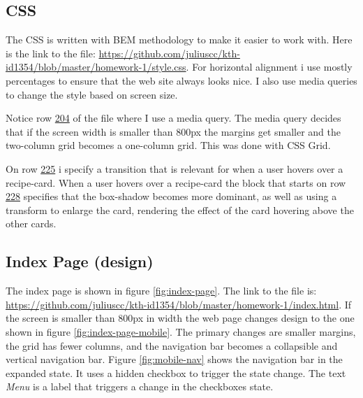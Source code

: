 \documentclass[a4paper]{scrartcl}
\begin{document}
\subsection{CSS}
The CSS is written with BEM methodology to make it easier to work with. Here is the link to the file: \href{https://github.com/juliuscc/kth-id1354/blob/master/homework-1/style.css}{https://github.com/juliuscc/kth-id1354/blob/master/homework-1/style.css}. For horizontal alignment i use mostly percentages to ensure that the web site always looks nice. I also use media queries to change the style based on screen size.

Notice row \href{https://github.com/juliuscc/kth-id1354/blob/090d3fcab0dbe83d8e9b82e8ad858ea1843d1ffe/homework-1/style.css#L204}{204} of the file where I use a media query. The media query decides that if the screen width is smaller than 800px the margins get smaller and the two-column grid becomes a one-column grid. This was done with CSS Grid.

On row \href{https://github.com/juliuscc/kth-id1354/blob/090d3fcab0dbe83d8e9b82e8ad858ea1843d1ffe/homework-1/style.css#L225}{225} i specify a transition that is relevant for when a user hovers over a recipe-card. When a user hovers over a recipe-card the block that starts on row \href{https://github.com/juliuscc/kth-id1354/blob/090d3fcab0dbe83d8e9b82e8ad858ea1843d1ffe/homework-1/style.css#L228}{228} specifies that the box-shadow becomes more dominant, as well as using a transform to enlarge the card, rendering the effect of the card hovering above the other cards.

\subsection{Index Page (design)}

The index page is shown in figure \ref{fig:index-page}. The link to the file is: \href{https://github.com/juliuscc/kth-id1354/blob/master/homework-1/index.html}{https://github.com/juliuscc/kth-id1354/blob/master/homework-1/index.html}. If the screen is smaller than 800px in width the web page changes design to the one shown in figure \ref{fig:index-page-mobile}. The primary changes are smaller margins, the grid has fewer columns, and the navigation bar becomes a collapsible and vertical navigation bar. Figure \ref{fig:mobile-nav} shows the navigation bar in the expanded state. It uses a hidden checkbox to trigger the state change. The text \textit{Menu} is a label that triggers a change in the checkboxes state.
\end{document}
